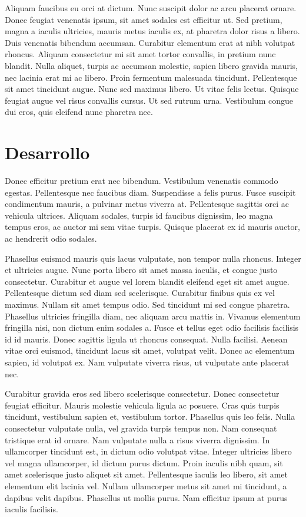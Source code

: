 \documentclass[
    a4paper, %
    10pt, %
    unnumbered sections, %
    two side, %
]{LTJournalArticle}
\begin{document}
Aliquam faucibus eu orci at dictum. Nunc suscipit dolor ac arcu placerat ornare. Donec feugiat venenatis ipsum, sit amet sodales est efficitur ut. Sed pretium, magna a iaculis ultricies, mauris metus iaculis ex, at pharetra dolor risus a libero. Duis venenatis bibendum accumsan. Curabitur elementum erat at nibh volutpat rhoncus. Aliquam consectetur mi sit amet tortor convallis, in pretium nunc blandit. Nulla aliquet, turpis ac accumsan molestie, sapien libero gravida mauris, nec lacinia erat mi ac libero. Proin fermentum malesuada tincidunt. Pellentesque sit amet tincidunt augue. Nunc sed maximus libero. Ut vitae felis lectus. Quisque feugiat augue vel risus convallis cursus. Ut sed rutrum urna. Vestibulum congue dui eros, quis eleifend nunc pharetra nec.


\section{Desarrollo}

Donec efficitur pretium erat nec bibendum. Vestibulum venenatis commodo egestas. Pellentesque nec faucibus diam. Suspendisse a felis purus. Fusce suscipit condimentum mauris, a pulvinar metus viverra at. Pellentesque sagittis orci ac vehicula ultrices. Aliquam sodales, turpis id faucibus dignissim, leo magna tempus eros, ac auctor mi sem vitae turpis. Quisque placerat ex id mauris auctor, ac hendrerit odio sodales.

Phasellus euismod mauris quis lacus vulputate, non tempor nulla rhoncus. Integer et ultricies augue. Nunc porta libero sit amet massa iaculis, et congue justo consectetur. Curabitur et augue vel lorem blandit eleifend eget sit amet augue. Pellentesque dictum sed diam sed scelerisque. Curabitur finibus quis ex vel maximus. Nullam sit amet tempus odio. Sed tincidunt mi sed congue pharetra. Phasellus ultricies fringilla diam, nec aliquam arcu mattis in. Vivamus elementum fringilla nisi, non dictum enim sodales a. Fusce et tellus eget odio facilisis facilisis id id mauris. Donec sagittis ligula ut rhoncus consequat. Nulla facilisi. Aenean vitae orci euismod, tincidunt lacus sit amet, volutpat velit. Donec ac elementum sapien, id volutpat ex. Nam vulputate viverra risus, ut vulputate ante placerat nec.

Curabitur gravida eros sed libero scelerisque consectetur. Donec consectetur feugiat efficitur. Mauris molestie vehicula ligula ac posuere. Cras quis turpis tincidunt, vestibulum sapien et, vestibulum tortor. Phasellus quis leo felis. Nulla consectetur vulputate nulla, vel gravida turpis tempus non. Nam consequat tristique erat id ornare. Nam vulputate nulla a risus viverra dignissim. In ullamcorper tincidunt est, in dictum odio volutpat vitae. Integer ultricies libero vel magna ullamcorper, id dictum purus dictum. Proin iaculis nibh quam, sit amet scelerisque justo aliquet sit amet. Pellentesque iaculis leo libero, sit amet elementum elit lacinia vel. Nullam ullamcorper metus sit amet mi tincidunt, a dapibus velit dapibus. Phasellus ut mollis purus. Nam efficitur ipsum at purus iaculis facilisis.
\end{document}
